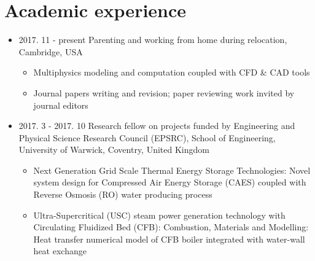 \documentclass[letterpaper]{article}
\begin{document}
\section*{Academic experience}
\vspace{-10pt}
\begin{itemize}
\item 2017. 11 - present \hspace{2pt} Parenting and working from home during relocation, Cambridge, USA
		\begin{itemize}
		\item Multiphysics modeling and computation coupled with CFD \& CAD tools
		\item	Journal papers writing and revision; paper reviewing work invited by journal editors
		\end{itemize}		
\item 2017. 3 - 2017. 10  \hspace{2pt} Research fellow on projects funded by Engineering and Physical Science Research Council (EPSRC), School of Engineering, University of Warwick, Coventry, United Kingdom
		\begin{itemize}
		\item	Next Generation Grid Scale Thermal Energy Storage Technologies: Novel system design for Compressed Air Energy Storage (CAES) coupled with Reverse Osmosis (RO) water producing process
		\item	Ultra-Supercritical (USC) steam power generation technology with Circulating Fluidized Bed (CFB): Combustion, Materials and Modelling: Heat transfer numerical model of CFB boiler integrated with water-wall heat exchange
		\end{itemize}


\end{itemize}
\end{document}
